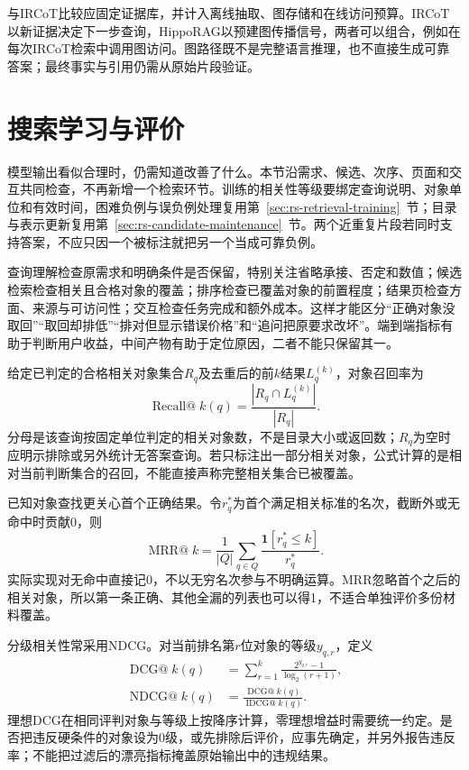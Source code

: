 与IRCoT比较应固定证据库，并计入离线抽取、图存储和在线访问预算。IRCoT以新证据决定下一步查询，HippoRAG以预建图传播信号，两者可以组合，例如在每次IRCoT检索中调用图访问。图路径既不是完整语言推理，也不直接生成可靠答案；最终事实与引用仍需从原始片段验证。

\section{搜索学习与评价}
\label{sec:rs-search-evaluation}

模型输出看似合理时，仍需知道改善了什么。本节沿需求、候选、次序、页面和交互共同检查，不再新增一个检索环节。训练的相关性等级要绑定查询说明、对象单位和有效时间，困难负例与误负例处理复用第~\ref{sec:rs-retrieval-training}~节；目录与表示更新复用第~\ref{sec:rs-candidate-maintenance}~节。两个近重复片段若同时支持答案，不应只因一个被标注就把另一个当成可靠负例。

查询理解检查原需求和明确条件是否保留，特别关注省略承接、否定和数值；候选检索检查相关且合格对象的覆盖；排序检查已覆盖对象的前置程度；结果页检查方面、来源与可访问性；交互检查任务完成和额外成本。这样才能区分“正确对象没取回”“取回却排低”“排对但显示错误价格”和“追问把原要求改坏”。端到端指标有助于判断用户收益，中间产物有助于定位原因，二者不能只保留其一。

给定已判定的合格相关对象集合$R_q$及去重后的前$k$结果$L_q^{(k)}$，对象召回率为
\begin{equation}
 \operatorname{Recall@}k(q)
 =\frac{|R_q\cap L_q^{(k)}|}{|R_q|}.
 \label{eq:rs-search-recall}
\end{equation}
分母是该查询按固定单位判定的相关对象数，不是目录大小或返回数；$R_q$为空时应明示排除或另外统计无答案查询。若只标注出一部分相关对象，公式计算的是相对当前判断集合的召回，不能直接声称完整相关集合已被覆盖。

已知对象查找更关心首个正确结果。令$r_q^*$为首个满足相关标准的名次，截断外或无命中时贡献0，则
\begin{equation}
 \operatorname{MRR@}k=
 \frac1{|Q|}\sum_{q\in Q}
   \frac{\mathbf1[r_q^*\leq k]}{r_q^*}.
 \label{eq:rs-search-mrr}
\end{equation}
实际实现对无命中直接记0，不以无穷名次参与不明确运算。MRR忽略首个之后的相关对象，所以第一条正确、其他全漏的列表也可以得1，不适合单独评价多份材料覆盖。

分级相关性常采用NDCG。对当前排名第$r$位对象的等级$y_{q,r}$，定义
\begin{equation}
 \begin{split}
 \operatorname{DCG@}k(q)&=
 \sum_{r=1}^{k}\frac{2^{y_{q,r}}-1}{\log_2(r+1)},\\
 \operatorname{NDCG@}k(q)&=
 \frac{\operatorname{DCG@}k(q)}{\operatorname{IDCG@}k(q)}.
 \end{split}
 \label{eq:rs-search-ndcg}
\end{equation}
理想DCG在相同评判对象与等级上按降序计算，零理想增益时需要统一约定。是否把违反硬条件的对象设为0级，或先排除后评价，应事先确定，并另外报告违反率；不能把过滤后的漂亮指标掩盖原始输出中的违规结果。

